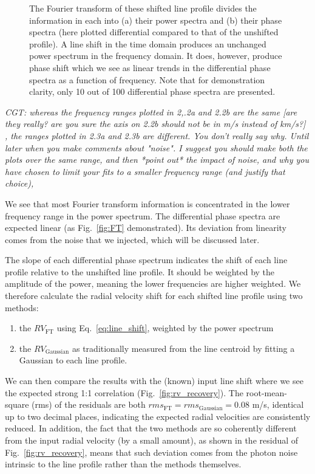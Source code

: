 \begin{figure}[tbp]
    \caption[Fourier transform of 100 shifted line profiles]{The Fourier transform of these shifted line profile divides the 
    information in each into (a) their power spectra and (b) their phase spectra (here plotted differential compared to that 	of the unshifted profile). A line shift in the time domain produces an unchanged power spectrum in the frequency domain.
    It does, however, produce phase shift which we see as linear trends in the differential phase spectra as a function of 		frequency. Note that for demonstration clarity, only 10 out of 100 differential phase spectra are presented.}
\label{fig:FT_process}
\end{figure}    

{\em CGT: whereas the frequency ranges plotted in 2,.2a and 2.2b are the same [are they really? are you sure the axis on 2.2b should not be in m/s instead of km/s?]
, the ranges plotted in 2.3a and 2.3b are different. You don't really say why. Until later when you make comments about "noise".
I suggest you should make both the plots over the same range, and then *point out* the impact of noise,
and why you have chosen to limit your fits to a smaller frequency range (and justify that choice),}

We see that most Fourier transform information is concentrated in the lower frequency range in the power spectrum.
The differential phase spectra are expected linear (as Fig.~\ref{fig:FT} demonstrated). Its deviation from linearity 
comes from the noise that we injected, which will be discussed later. 

The slope of each differential phase spectrum indicates the shift of each line profile relative to 
the unshifted line profile. It should be weighted by the amplitude of the power, meaning the lower frequencies 
are higher weighted. We therefore calculate the radial velocity shift for each shifted line profile
using two methods: 
\begin{enumerate}
	\item the $RV_\text{FT}$ using Eq.~\ref{eq:line_shift}, weighted by the power spectrum
	\item the $RV_\text{Gaussian}$ as traditionally measured from the line centroid by fitting a Gaussian to each line profile.
\end{enumerate}
We can then compare the results with the (known) input line shift where we see the expected strong 1:1 correlation (Fig.~\ref{fig:rv_recovery}). The root-mean-square (rms) of the residuals are both $rms_\text{FT} = rms_\text{Gaussian} = 0.08$ m/s, identical up to two decimal places, indicating the expected radial velocities are consistently reduced. In addition, the fact that the two methods are so coherently different from the input radial velocity (by a small amount), as shown in the residual of Fig.~\ref{fig:rv_recovery}, means that such deviation comes from the photon noise intrinsic to the line profile rather than the methods themselves. 

